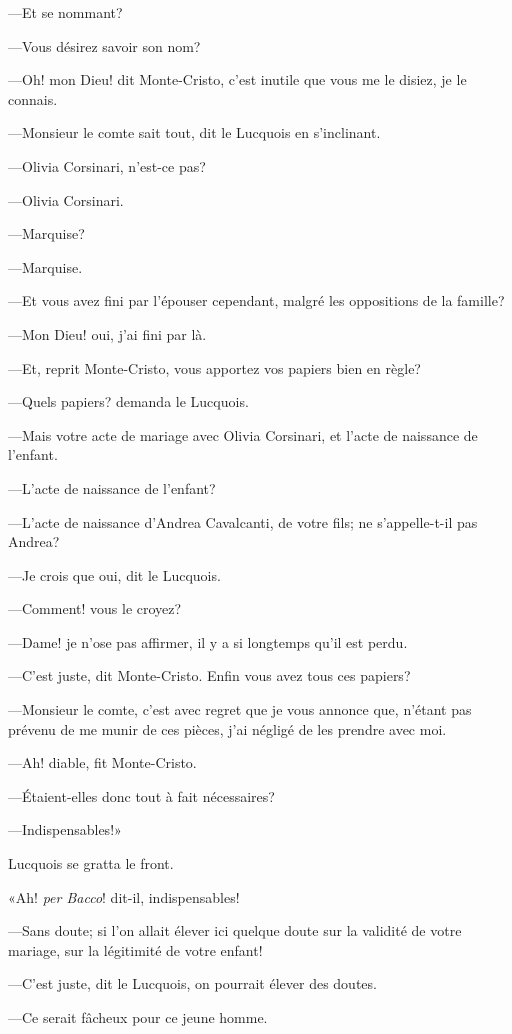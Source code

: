 —Et se nommant? 

—Vous désirez savoir son nom? 

—Oh! mon Dieu! dit Monte-Cristo, c'est inutile que vous me le disiez, je le connais. 

—Monsieur le comte sait tout, dit le Lucquois en s'inclinant. 

—Olivia Corsinari, n'est-ce pas? 

—Olivia Corsinari. 

—Marquise? 

—Marquise. 

—Et vous avez fini par l'épouser cependant, malgré les oppositions de la famille? 

—Mon Dieu! oui, j'ai fini par là. 

—Et, reprit Monte-Cristo, vous apportez vos papiers bien en règle? 

—Quels papiers? demanda le Lucquois. 

—Mais votre acte de mariage avec Olivia Corsinari, et l'acte de naissance de l'enfant. 

—L'acte de naissance de l'enfant? 

—L'acte de naissance d'Andrea Cavalcanti, de votre fils; ne s'appelle-t-il pas Andrea? 

—Je crois que oui, dit le Lucquois. 

—Comment! vous le croyez? 

—Dame! je n'ose pas affirmer, il y a si longtemps qu'il est perdu. 

—C'est juste, dit Monte-Cristo. Enfin vous avez tous ces papiers? 

—Monsieur le comte, c'est avec regret que je vous annonce que, n'étant pas prévenu de me munir de ces pièces, j'ai négligé de les prendre avec moi. 

—Ah! diable, fit Monte-Cristo. 

—Étaient-elles donc tout à fait nécessaires? 

—Indispensables!» 

Lucquois se gratta le front. 

«Ah! \textit{per Bacco}! dit-il, indispensables! 

—Sans doute; si l'on allait élever ici quelque doute sur la validité de votre mariage, sur la légitimité de votre enfant! 

—C'est juste, dit le Lucquois, on pourrait élever des doutes. 

—Ce serait fâcheux pour ce jeune homme. 

